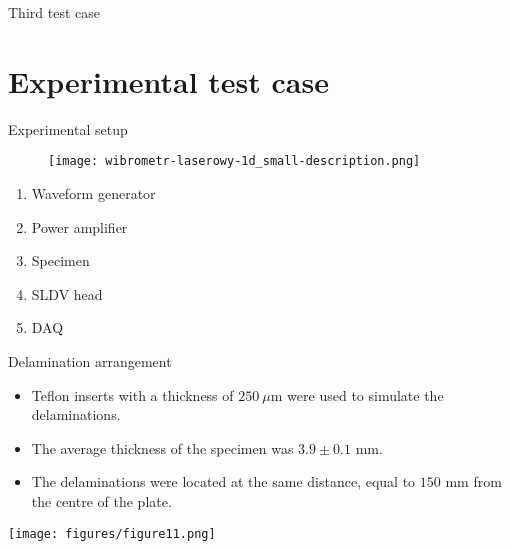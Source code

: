 \documentclass[10pt,aspectratio=169]{beamer} %
\begin{document}
\setcounter{subfigure}{0}
\begin{frame}{Third test case}
	\begin{figure}
		\centering
		\quad
		\quad
	\end{figure}
\end{frame}

\section{Experimental test case}
\setcounter{subfigure}{0}
\begin{frame}{Experimental setup}
	\begin{minipage}[t]{0.55\textwidth}
		\begin{figure}
			\centering
			\texttt{[image: wibrometr-laserowy-1d\_small-description.png]}
		\end{figure}
	\end{minipage}
	\begin{minipage}[t]{0.4\textwidth}
		\begin{enumerate}
			\item Waveform generator
			\item Power amplifier	
			\item Specimen
			\item SLDV head
			\item DAQ
		\end{enumerate}
	\end{minipage}
\end{frame}

\setcounter{subfigure}{0}
\begin{frame}{Delamination arrangement}
	\begin{minipage}[c]{0.4\textwidth}
		\begin{itemize}
			\item Teflon inserts with a thickness of \(250\ \mu\)m were used to simulate the delaminations.
			\item The average thickness of the specimen was \(3.9 \pm 0.1\) mm.
			\item The delaminations were located at the same distance, equal to \(150\) mm from the centre of the plate.
		\end{itemize}
	\end{minipage}
	\begin{minipage}[c]{0.55\textwidth}
		\centering
		\texttt{[image: figures/figure11.png]}
	\end{minipage}
\end{frame}
\end{document}
